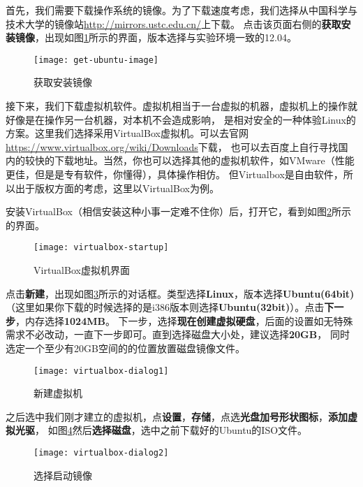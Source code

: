 首先，我们需要下载操作系统的镜像。为了下载速度考虑，我们选择从中国科学与技术大学的镜像站\url{http://mirrors.ustc.edu.cn/}上下载。
点击该页面右侧的\textbf{获取安装镜像}，出现如图\ref{fig:get-ubuntu-image}所示的界面，版本选择与实验环境一致的12.04。

\begin{figure}[htbp]
  \centering
  \texttt{[image: get-ubuntu-image]}
  \caption{获取安装镜像}\label{fig:get-ubuntu-image}
\end{figure}

接下来，我们下载虚拟机软件。虚拟机相当于一台虚拟的机器，虚拟机上的操作就好像是在操作另一台机器，对本机不会造成影响，
是相对安全的一种体验Linux的方案。这里我们选择采用VirtualBox虚拟机。可以去官网\url{https://www.virtualbox.org/wiki/Downloads}下载，
也可以去百度上自行寻找国内的较快的下载地址。当然，你也可以选择其他的虚拟机软件，如VMware（性能更佳，但是是专有软件，你懂得），具体操作相仿。
但Virtualbox是自由软件，所以出于版权方面的考虑，这里以VirtualBox为例。

安装VirtualBox（相信安装这种小事一定难不住你）后，打开它，看到如图\ref{fig:virtualbox-startup}所示的界面。

\begin{figure}[htbp]
  \centering
  \texttt{[image: virtualbox-startup]}
  \caption{VirtualBox虚拟机界面}\label{fig:virtualbox-startup}
\end{figure}

点击\textbf{新建}，出现如图\ref{fig:virtualbox-dialog1}所示的对话框。类型选择\textbf{Linux}，版本选择\textbf{Ubuntu(64bit)}
（这里如果你下载的时候选择的是i386版本则选择\textbf{Ubuntu(32bit)}）。点击\textbf{下一步}，内存选择\textbf{1024MB}。
下一步，选择\textbf{现在创建虚拟硬盘}，后面的设置如无特殊需求不必改动，一直下一步即可。直到选择磁盘大小处，建议选择\textbf{20GB}，
同时选定一个至少有20GB空间的的位置放置磁盘镜像文件。

\begin{figure}[htbp]
  \centering
  \texttt{[image: virtualbox-dialog1]}
  \caption{新建虚拟机}\label{fig:virtualbox-dialog1}
\end{figure}

之后选中我们刚才建立的虚拟机，点\textbf{设置}，\textbf{存储}，点选\textbf{光盘加号形状图标}，\textbf{添加虚拟光驱}，
如图\ref{fig:virtualbox-dialog2}然后\textbf{选择磁盘}，选中之前下载好的Ubuntu的ISO文件。
      
\begin{figure}[htbp]
  \centering
  \texttt{[image: virtualbox-dialog2]}
  \caption{选择启动镜像}\label{fig:virtualbox-dialog2}
\end{figure}

